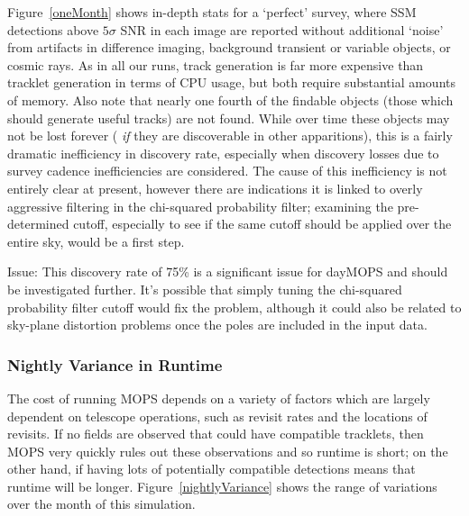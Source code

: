 Figure~\ref{oneMonth} shows in-depth stats for a `perfect' survey,
where SSM detections above $5\sigma$ SNR in each image are reported
without additional `noise' from artifacts in difference imaging,
background transient or variable objects, or cosmic rays. 
As in all our runs, track generation is far more expensive than
tracklet generation in terms of CPU usage, but both require
substantial amounts of memory.  Also note that nearly one fourth of
the findable objects (those which should generate useful tracks) are
not found. While over time these objects may not be lost forever ({\it
  if} they are discoverable in other apparitions), this is a fairly dramatic
inefficiency in discovery rate, especially when discovery losses due
to survey cadence inefficiencies are considered. The cause of this
inefficiency is not entirely clear at present, however there are
indications it is linked to overly aggressive filtering in the
chi-squared probability filter; examining the pre-determined cutoff,
especially to see if the same cutoff should be applied over the entire
sky, would be a first step. 

Issue: This discovery rate of 75\% is a significant issue for dayMOPS
and should be investigated further. It's possible that simply tuning
the chi-squared probability filter cutoff would fix the problem,
although it could also be related to sky-plane distortion problems
once the poles are included in the input data. 

\subsubsection{Nightly Variance in Runtime}

The cost of running MOPS depends on a variety of factors which are
largely dependent on telescope operations, such as revisit rates and
the locations of revisits.  If no fields are observed that could have
compatible tracklets, then MOPS very quickly rules out these
observations and so runtime is short; on the other hand, if
having lots of potentially compatible detections means that runtime
will be longer. Figure~\ref{nightlyVariance} shows the range of
variations over the month of this simulation. 


